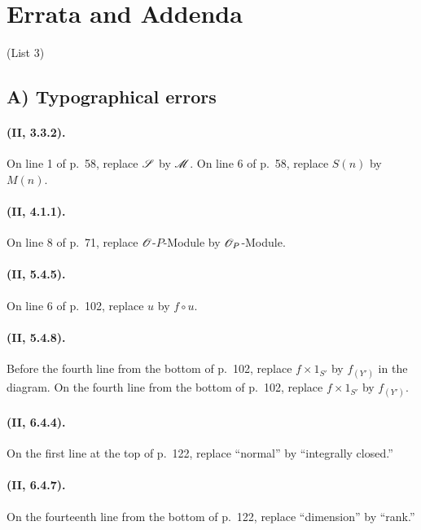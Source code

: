 \clearpage
{}
{}
\section*{Errata and Addenda}
\begin{center}\large (List 3)\end{center}

\subsection*{A) Typographical errors}

\paragraph{(II, 3.3.2).}
On line 1 of p.~58, replace $\mathscr{S}$ by $\mathscr{M}$.  On line 6 of p.~58,
replace $S(n)$ by $M(n)$.

\paragraph{(II, 4.1.1).}
On line 8 of p.~71, replace $\mathscr{O}$-$P$-Module by
$\mathscr{O}_P$-Module.

\paragraph{(II, 5.4.5).}
On line 6 of p.~102, replace $u$ by $f\circ u$.

\paragraph{(II, 5.4.8).}
Before the fourth line from the bottom of p.~102, replace
$f\times 1_{S'}$ by $f_{(Y')}$ in the diagram.  On the fourth line from
the bottom of p.~102, replace $f\times 1_{S'}$ by $f_{(Y')}$.

\paragraph{(II, 6.4.4).}
On the first line at the top of p.~122, replace ``normal'' by
``integrally closed.''

\paragraph{(II, 6.4.7).}
On the fourteenth line from the bottom of p.~122, replace ``dimension''
by ``rank.''

